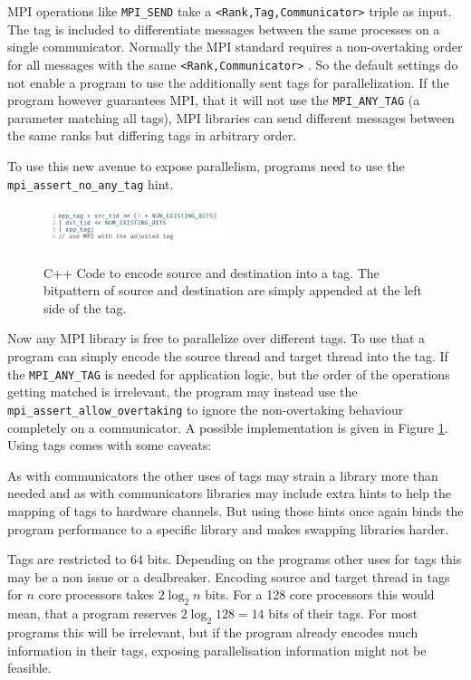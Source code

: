 \documentclass[sigconf]{acmart}
\begin{document}
MPI operations like \verb|MPI_SEND| take a \verb|<Rank,Tag,Communicator>| triple as input.
The tag is included to differentiate messages between the same processes on a single communicator.
Normally the MPI standard requires a non-overtaking order for all messages with the same \verb|<Rank,Communicator>| \cite{mpi40}.
So the default settings do not enable a program to use the additionally sent tags for parallelization.
If the program however guarantees MPI, that it will not use the \verb|MPI_ANY_TAG| (a parameter matching all tags), MPI libraries can send different messages between the same ranks but differing tags in arbitrary order.

To use this new avenue to expose parallelism, programs need to use the \verb|mpi_assert_no_any_tag| hint.

\begin{figure}
    \caption{
        C++ Code to encode source and destination into a tag.
        The bitpattern of source and destination are simply appended at the left side of the tag.
    }
    \includegraphics[width=0.47\textwidth]{Tags_CPP.png}
    \label{fig:Tags_CPP}
\end{figure}

Now any MPI library is free to parallelize over different tags.
To use that a program can simply encode the source thread and target thread into the tag.
If the \verb|MPI_ANY_TAG| is needed for application logic, but the order of the operations getting matched is irrelevant, the program may instead use the \verb|mpi_assert_allow_overtaking| to ignore the non-overtaking behaviour completely on a communicator.
A possible implementation is given in Figure \ref{fig:Tags_CPP}.
Using tags comes with some caveats:

As with communicators the other uses of tags may strain a library more than needed and as with communicators libraries may include extra hints to help the mapping of tags to hardware channels.
But using those hints once again binds the program performance to a specific library and makes swapping libraries harder.

Tags are restricted to 64 bits.
Depending on the programs other uses for tags this may be a non issue or a dealbreaker.
Encoding source and target thread in tags for $n$ core processors takes $2\log_2{n}$ bits.
For a 128 core processors this would mean, that a program reserves $2\log_2{128} = 14$ bits of their tags.
For most programs this will be irrelevant, but if the program already encodes much information in their tags, exposing parallelisation information might not be feasible.
\end{document}

